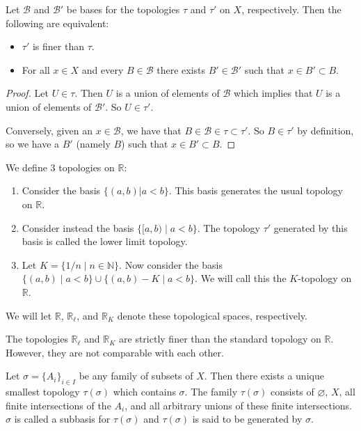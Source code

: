 \begin{proposition}
Let $\mathcal{B}$ and $\mathcal{B}'$ be bases for the topologies $\tau$ and $\tau'$ on $X$, respectively. Then the following are equivalent:
\begin{itemize}
	\item $\tau'$ is finer than $\tau$.
	\item For all $x \in X$ and every $B \in \mathcal{B}$ there exists $B' \in \mathcal{B}'$ such that $x \in B' \subset B$.
\end{itemize}
\end{proposition}
\begin{proof}
Let $U \in \tau$. Then $U$ is a union of elements of $\mathcal{B}$ which implies that $U$ is a union of elements of $\mathcal{B}'$. So $U \in \tau'$. 

Conversely, given an $x \in \mathcal{B}$, we have that $B \in \mathcal{B} \in \tau \subset \tau'$. So $B \in \tau'$ by definition, so we have a $B'$ (namely $B$) such that $x \in B' \subset B$.
\end{proof}

\begin{definition}
We define $3$ topologies on $\mathbb{R}$:
\begin{enumerate}
	\item Consider the basis $\{(a,b) | a < b\}$. This basis generates the usual topology on $\mathbb{R}$.
	\item Consider instead the basis $\{[a,b) \mid a < b\}$. The topology $\tau'$ generated by this basis is called the lower limit topology.
	\item Let $K = \{1/n \mid n \in \mathbb{N}\}$. Now consider the basis $\{(a, b) \mid a < b\} \cup \{(a, b) - K \mid a < b\}$. We will call this the $K$-topology on $\mathbb{R}$.
\end{enumerate}
We will let $\mathbb{R}$, $\mathbb{R}_{\ell}$, and $\mathbb{R}_K$ denote these topological spaces, respectively.
\end{definition}

\begin{proposition}
The topologies $\mathbb{R}_{\ell}$ and $\mathbb{R}_K$ are strictly finer than the standard topology on $\mathbb{R}$. However, they are not comparable with each other.
\end{proposition}

\begin{definition}
Let $\sigma = \{A_i\}_{i \in I}$ be any family of subsets of $X$. Then there exists a unique smallest topology $\tau(\sigma)$ which contains $\sigma$. The family $\tau(\sigma)$ consists of $\varnothing$, $X$, all finite intersections of the $A_i$, and all arbitrary unions of these finite intersections. $\sigma$ is called a subbasis for $\tau(\sigma)$ and $\tau(\sigma)$ is said to be generated by $\sigma$.
\end{definition}

